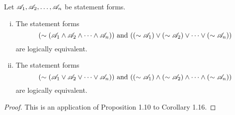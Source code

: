 \begin{proposition}
  Let \(\mathscr{A}_1, \mathscr{A}_2, \dots, \mathscr{A}_n\) be statement forms.
  \begin{enumerate}[(i)]
    \item The statement forms
  \[(\sim(\mathscr{A}_1 \land \mathscr{A}_2 \land \dots \land \mathscr{A}_n)) \text{ and } ((\sim \mathscr{A}_1) \lor (\sim \mathscr{A}_2) \lor \dots \lor (\sim \mathscr{A}_n))\]
  are logically equivalent.

    \item The statement forms
  \[(\sim(\mathscr{A}_1 \lor \mathscr{A}_2 \lor \dots \lor \mathscr{A}_n)) \text{ and } ((\sim \mathscr{A}_1) \land (\sim \mathscr{A}_2) \land \dots \land (\sim \mathscr{A}_n))\]
  are logically equivalent.
  \end{enumerate}

  \begin{proof}
    This is an application of Proposition 1.10 to Corollary 1.16.
  \end{proof}
\end{proposition}

